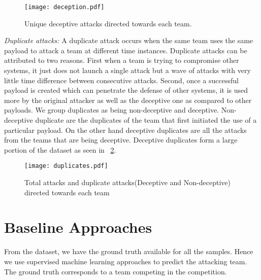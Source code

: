 \documentclass[conference]{IEEEtran}
\begin{document}
\begin{figure}[htp!]
	\centerline{\texttt{[image: deception.pdf]}}
	\captionsetup{justification=centering}
	
	\caption{\textmd{Unique deceptive attacks directed towards each team.}}

	\label{fig:one}
\end{figure}
\vspace{-1em}
\noindent\textit{Duplicate attacks:}
A duplicate attack occurs when the same team uses the same payload to attack a team at different time instances. Duplicate attacks can be attributed to two reasons. First when a team is trying to compromise other systems, it just does not launch a single attack but a wave of attacks with very little time difference between consecutive attacks. Second, once a successful payload is created which can penetrate the defense of other systems, it is used more by the original attacker as well as the deceptive one as compared to other payloads. We group duplicates as being non-deceptive and deceptive. Non-deceptive duplicate are the duplicates of the team that first initiated the use of a particular payload. On the other hand deceptive duplicates are all the attacks from the teams that are being deceptive. Deceptive duplicates form a large portion of the dataset as seen in \figurename~\ref{fig:two}. 


\begin{figure}[htp!]
	\centerline{\texttt{[image: duplicates.pdf]}}
	\captionsetup{justification=centering}
	
	\caption{\textmd{Total attacks and duplicate attacks(Deceptive and Non-deceptive) directed towards each team}}
	
	\label{fig:two}
\end{figure}



\section{Baseline Approaches}
\label{baselineAppr}
From the dataset, we have the ground truth available for all the samples. Hence we use supervised machine learning approaches to predict the attacking team. The ground truth corresponds to a team competing in the competition.
\end{document}
